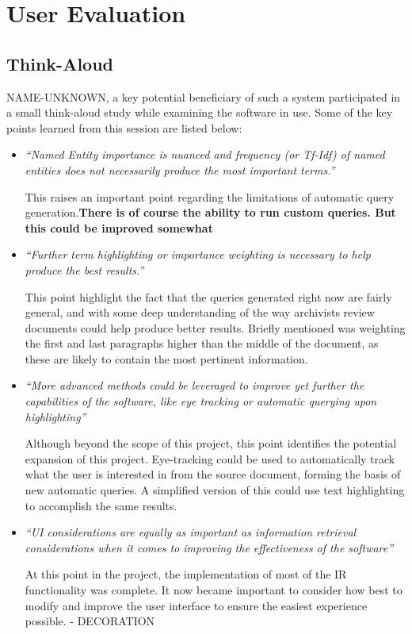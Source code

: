 \documentclass{l4proj}
\begin{document}
\section{User Evaluation}
\subsection{Think-Aloud}

NAME-UNKNOWN, a key potential beneficiary of such a system participated in a small think-aloud study while examining the software in use. Some of the key points learned from this session are listed below:

\begin{itemize}
\item \textit{``Named Entity importance is nuanced and frequency (or Tf-Idf) of named entities does not necessarily produce the most important terms.''}
\par
This raises an important point regarding the limitations of automatic query generation.\textbf{There is of course the ability to run custom queries. But this could be improved somewhat}

\item \textit{``Further term highlighting or importance weighting is necessary to help produce the best results.''}
\par
This point highlight the fact that the queries generated right now are fairly general, and with some deep understanding of the way archivists review documents could help produce better results. Briefly mentioned was weighting the first and last paragraphs higher than the middle of the document, as these are likely to contain the most pertinent information.

\item \textit{``More advanced methods could be leveraged to improve yet further the capabilities of the software, like eye tracking or automatic querying upon highlighting''}
\par
Although beyond the scope of this project, this point identifies the potential expansion of this project. Eye-tracking could be used to automatically track what the user is interested in from the source document, forming the basis of new automatic queries. A simplified version of this could use text highlighting to accomplish the same results.

\item \textit{``UI considerations are equally as important as information retrieval considerations when it comes to improving the effectiveness of the software''}
\par
At this point in the project, the implementation of most of the IR functionality was complete. It now became important to consider how best to modify and improve the user interface to ensure the easiest experience possible. - DECORATION
\end{itemize}
\end{document}
